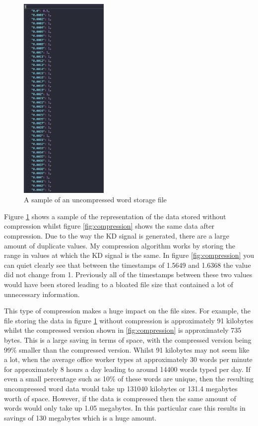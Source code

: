 \documentclass[10pt,a4paper]{report}
\begin{document}
\begin{figure}
	\begin{center}
		\includegraphics[width=0.38\textwidth]{UncompressedData}
	\end{center}
	\caption{A sample of an uncompressed word storage file}
	\label{fig:uncomp}
\end{figure}

Figure \ref{fig:uncomp} shows a sample of the representation of the data stored without compression whilst figure \ref{fig:compression} shows the same data after compression. Due to the way the KD signal is generated, there are a large amount of duplicate values. My compression algorithm works by storing the range in values at which the KD signal is the same. In figure \ref{fig:compression} you can quiet clearly see that between the timestamps of 1.5649 and 1.6368 the value did not change from 1. Previously all of the timestamps between these two values would have been stored leading to a bloated file size that contained a lot of unnecessary information.

This type of compression makes a huge impact on the file sizes. For example, the file storing the data in figure \ref{fig:uncomp} without compression is approximately 91 kilobytes whilst the compressed version shown in \ref{fig:compression} is approximately 735 bytes. This is a large saving in terms of space, with the compressed version being 99\% smaller than the compressed version. Whilst 91 kilobytes may not seem like a lot, when the average office worker types at approximately 30 words per minute\cite{naskar_2020} for approximately 8 hours a day leading to around 14400 words typed per day. If even a small percentage such as 10\% of these words are unique, then the resulting uncompressed word data would take up 131040 kilobytes or 131.4 megabytes worth of space. However, if the data is compressed then the same amount of words would only take up 1.05 megabytes. In this particular case this results in savings of 130 megabytes which is a huge amount.
\end{document}
